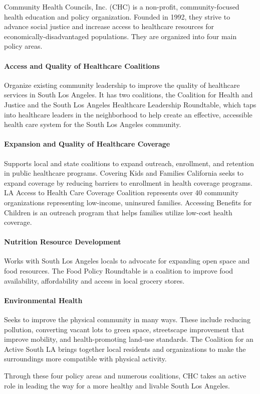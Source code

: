 Community Health Councils, Inc. (CHC) is a non-profit, community-focused health education and policy organization.  Founded in 1992, they strive to advance social justice and increase access to healthcare resources for economically-disadvantaged populations.  They are organized into four main policy areas.
	\paragraph{Access and Quality of Healthcare Coalitions} Organize existing community leadership to improve the quality of healthcare services in South Los Angeles.  It has two coalitions, the Coalition for Health and Justice and the South Los Angeles Healthcare Leadership Roundtable, which taps into healthcare leaders in the neighborhood to help create an effective, accessible health care system for the South Los Angeles community.
	\paragraph{Expansion and Quality of Healthcare Coverage} Supports local and state coalitions to expand outreach, enrollment, and retention in public healthcare programs.  Covering Kids and Families California seeks to expand coverage by reducing barriers to enrollment in health coverage programs.  LA Access to Health Care Coverage Coalition represents over 40 community organizations representing low-income, uninsured families.  Accessing Benefits for Children is an outreach program that helps families utilize low-cost health coverage. 
	\paragraph{Nutrition Resource Development} Works with South Los Angeles locals to advocate for expanding open space and food resources.  The Food Policy Roundtable is a coalition to improve food availability, affordability and access in local grocery stores. 
	\paragraph{Environmental Health} Seeks to improve the physical community in many ways.  These include reducing pollution, converting vacant lots to green space, streetscape improvement that improve mobility, and health-promoting land-use standards.  The Coalition for an Active South LA brings together local residents and organizations to make the surroundings more compatible with physical activity. 
	 
	Through these four policy areas and numerous coalitions, CHC takes an active role in leading the way for a more healthy and livable South Los Angeles.